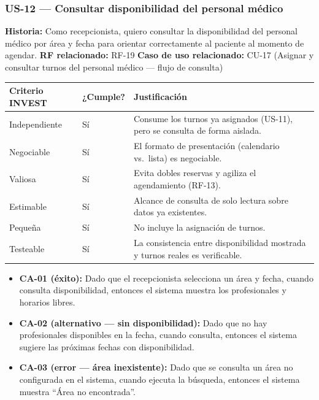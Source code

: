\documentclass[11pt,a4paper]{article}
\providecommand{\tightlist}{%
	\setlength{\itemsep}{0pt}\setlength{\parskip}{0pt}}
\begin{document}
	\subsubsection{US-12 --- Consultar disponibilidad del personal médico}
	
	\textbf{Historia:} Como recepcionista, quiero consultar la disponibilidad del personal médico por área y fecha para orientar correctamente al paciente al momento de agendar.
	\textbf{RF relacionado:} RF-19
	\textbf{Caso de uso relacionado:} CU-17 (Asignar y consultar turnos del personal médico --- flujo de consulta)
	
	\begin{longtable}{p{} p{} p{}}
		
		
		\toprule
		\textbf{Criterio INVEST} &
		\textbf{¿Cumple?} &
		\textbf{Justificación} \\
		\midrule
		\endhead
		
		Independiente & Sí & Consume los turnos ya asignados (US-11), pero se consulta de forma aislada. \\
		Negociable & Sí & El formato de presentación (calendario vs.~lista) es negociable. \\
		Valiosa & Sí & Evita dobles reservas y agiliza el agendamiento (RF-13). \\
		Estimable & Sí & Alcance de consulta de solo lectura sobre datos ya existentes. \\
		Pequeña & Sí & No incluye la asignación de turnos. \\
		Testeable & Sí & La consistencia entre disponibilidad mostrada y turnos reales es verificable. \\
		
		\bottomrule
	\end{longtable}
	
	\begin{itemize}
		\tightlist
		\item
		\textbf{CA-01 (éxito):} Dado que el recepcionista selecciona un área y fecha, cuando consulta disponibilidad, entonces el sistema muestra los profesionales y horarios libres.
		\item
		\textbf{CA-02 (alternativo --- sin disponibilidad):} Dado que no hay profesionales disponibles en la fecha, cuando consulta, entonces el sistema sugiere las próximas fechas con disponibilidad.
		\item
		\textbf{CA-03 (error --- área inexistente):} Dado que se consulta un área no configurada en el sistema, cuando ejecuta la búsqueda, entonces el sistema muestra ``Área no encontrada''.
	\end{itemize}
	
\end{document}
